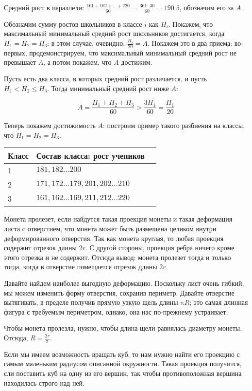 ﻿
\begin{itemize}
\itA Средний рост в параллели: $\frac{161 + 162 + \ldots + 220}{60} = \frac{361\cdot 30}{60} = 190.5$,
обозначим его за $A$.

Обозначим сумму ростов школьников в классе $i$ как $H_i$. Покажем, что максимальный 
минимальный средний рост школьников достигается, когда $H_1 = H_2 = H_3$: в этом случае,
очевидно, $\frac{H_i}{20} = A$. Покажем это в два приема: во-первых, продемонстрируем,
что максимальный минимальный средний рост не превышает $A$, а потом покажем, что
$A$ достижим.

Пусть есть два класса, в которых средний рост различается, и пусть $H_1 < H_2 \le H_3$. 
Тогда минимальный средний рост ниже $A$: 

$$A = \frac{H_1 + H_2 + H_3}{60} > \frac{3H_1}{60} = \frac{H_1}{20}$$

Теперь покажем достижимость $A$: построим пример такого разбиения на классы,
что $H_1 = H_2 = H_3$.

\begin{center}\begin{tabular}{lll}
Класс & Состав класса: рост учеников \\
\hline
1 & $181, 182 \ldots 200$\\
2 & $171, 172 \ldots 179, 201, 202 \ldots 210$ \\
3 & $161, 162 \ldots 169, 211, 212 \ldots 220$
\end{tabular}\end{center}

\itB Монета пролезет, если найдутся такая проекция монеты и такая деформация 
листа с отверстием, что монета может быть размещена целиком внутри деформированного
отверстия. Так как монета круглая, то любая проекция содержит отрезок длины $2r$. 
С другой стороны, проекция ребра ничего кроме этого отрезка и не содержит. 
Отсюда вывод: монета пролезет тогда и только тогда, когда в отверстие помещается 
отрезок длины $2r$.

Давайте найдем наиболее выгодную деформацию.
Поскольку лист очень гибкий, мы можем изменить форму отверстия, сохранив периметр.
Давайте отверстие вытягивать, в пределе получив прямую узкую щель длины $\text{π}R$;  это
самая длинная фигура с требуемым периметром, однако, она нас по-прежнему устраивает.

Чтобы монета пролезла, нужно, чтобы длина щели равнялась диаметру монеты. Отсюда, $R = \frac{2r}{\text{π}}$.

\itC Если мы имеем возможность вращать куб, то нам нужно найти его проекцию с самым маленьким
радиусом описанной окружности. Такая проекция получится, сли поставить куб на одну из
его вершин, так чтобы противоположная вершина находилась строго над ней.


\end{itemize}
